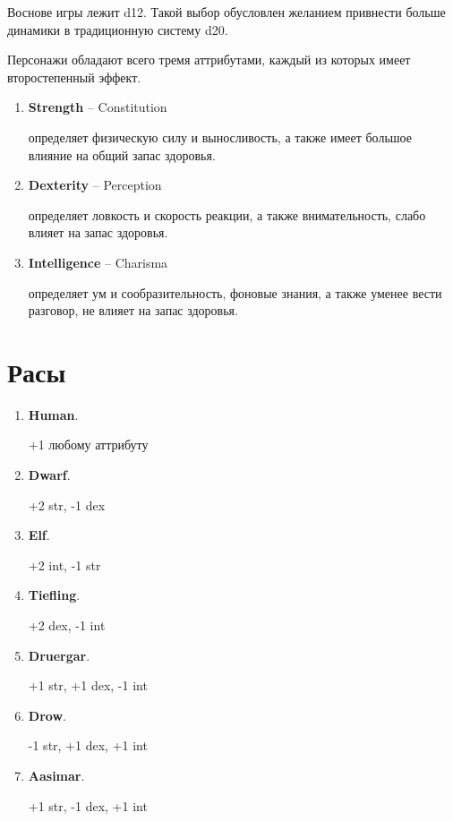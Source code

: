 \documentclass[a4paper,12pt,twocolumn]{book}
\begin{document}
\lettrine{В}{}основе игры лежит d12. Такой выбор обусловлен желанием привнести больше динамики в традиционную систему d20.

Персонажи обладают всего тремя аттрибутами, каждый из которых имеет второстепенный эффект.


\begin{enumerate}
  \item \textbf{Strength} -- Constitution

  определяет физическую силу и выносливость, а также имеет большое влияние на общий запас здоровья.

  \item \textbf{Dexterity} -- Perception

  определяет ловкость и скорость реакции, а также внимательность, слабо влияет на запас здоровья.

\item \textbf{Intelligence} -- Charisma

  определяет ум и сообразительность, фоновые знания, а также уменее вести разговор, не влияет на запас здоровья.
\end{enumerate}

\pagebreak

\section{Расы}


\begin{enumerate}
  \item \textbf{Human}.

  +1 любому аттрибуту

  \item \textbf{Dwarf}.

  +2 str, -1 dex

  \item \textbf{Elf}.

  +2 int, -1 str

  \item \textbf{Tiefling}.

  +2 dex, -1 int

  \item \textbf{Druergar}.

  +1 str, +1 dex, -1 int

  \item \textbf{Drow}.

  -1 str, +1 dex, +1 int

  \item \textbf{Aasimar}.

  +1 str, -1 dex, +1 int

\end{enumerate}
\end{document}
